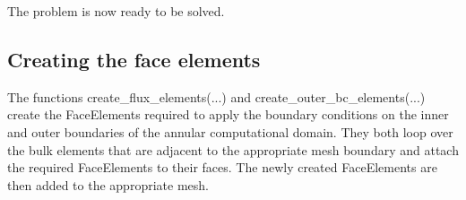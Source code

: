 The problem is now ready to be solved.



 

\hypertarget{index_create_flux}{}\subsection{Creating the face elements}\label{index_create_flux}
The functions {\ttfamily create\+\_\+flux\+\_\+elements}(...) and {\ttfamily create\+\_\+outer\+\_\+bc\+\_\+elements}(...) create the {\ttfamily Face\+Elements} required to apply the boundary conditions on the inner and outer boundaries of the annular computational domain. They both loop over the bulk elements that are adjacent to the appropriate mesh boundary and attach the required {\ttfamily Face\+Elements} to their faces. The newly created {\ttfamily Face\+Elements} are then added to the appropriate mesh.

